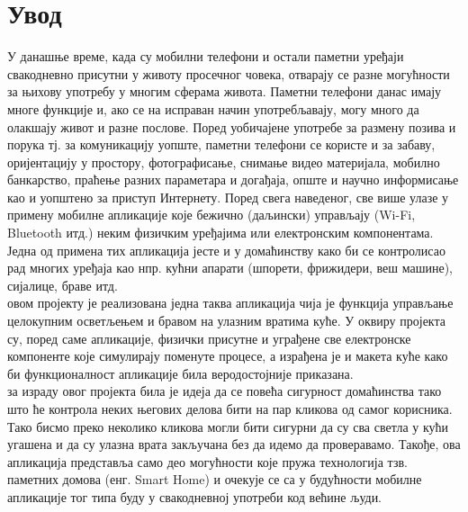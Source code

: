 \documentclass[12pt]{article}
\begin{document}
\tableofcontents
\newpage

\section{Увод}
\justifying
У данашње време, када су мобилни телефони и остали паметни уређаји свакодневно присутни у животу просечног човека, отварају се разне могућности за њихову употребу у многим сферама живота. Паметни телефони данас имају многе функције и, ако се на исправан начин употребљавају, могу много да олакшају живот и разне послове. Поред уобичајене употребе за размену позива и порука тј. за комуникацију уопште, паметни телефони се користе и за забаву, оријентацију у простору, фотографисање, снимање видео материјала, мобилно банкарство, праћење разних параметара и догађаја, опште и научно информисање као и уопштено за приступ Интернету. Поред свега наведеног, све више улазе у примену мобилне апликације које бежично (даљински) управљају (Wi-Fi, Bluetooth итд.) неким физичким уређајима или електронским компонентама. Једна од примена тих апликација јесте и у домаћинству како би се контролисао рад многих уређаја као нпр. кућни апарати (шпорети, фрижидери, веш машине), сијалице, браве итд.
\vspace{0.3cm}\\ овом пројекту је реализована једна таква апликација чија је функција управљање целокупним осветљењем и бравом на улазним вратима куће. У оквиру пројекта су, поред саме апликације, физички присутне и уграђене све електронске компоненте које симулирају поменуте процесе, а израђена је и макета куће како би функционалност апликације била веродостојније приказана. 
\vspace{0.3cm}\\ за израду овог пројекта била је идеја да се повећа сигурност домаћинства тако што ће контрола неких његових делова бити на пар кликова од самог корисника. Тако бисмо преко неколико кликова могли бити сигурни да су сва светла у кући угашена и да су улазна врата закључана без да идемо да проверавамо. Такође, ова апликација представља само део могућности које пружа технологија тзв. паметних домова (енг. Smart Home) и очекује се са у будућности мобилне апликације тог типа буду у свакодневној употреби код већине људи.\\

\newpage
\end{document}
